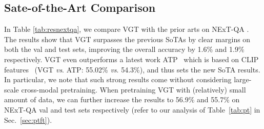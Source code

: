 \documentclass[runningheads]{llncs}
\newcommand{\vs}{\textit{vs}. }
\begin{document}
\subsection{Sate-of-the-Art Comparison}
In Table \ref{tab:resnextqa}, we compare VGT with the prior arts on NExT-QA \cite{xiao2021video}. The results show that VGT surpasses the previous SoTAs by clear margins on both the val and test sets, improving the overall accuracy by 1.6\% and 1.9\% respectively. VGT even outperforms a latest work ATP~\cite{buch2022revisiting} which is based on CLIP features~\cite{radford2021learning} (VGT \vs ATP: 55.02\% \vs 54.3\%), and thus sets the new SoTA results. In particular, we note that such strong results come without considering large-scale cross-modal pretraining. When pretraining VGT with (relatively) small amount of data, we can further increase the results to 56.9\% and 55.7\% on NExT-QA val and test sets respectively (refer to our analysis of Table~\ref{tab:pt} in Sec.~\ref{sec:ptft}). 
\setlength{\tabcolsep}{3.2pt}
\begin{table*}[t!]
    \small
    \centering
    \caption{Results on NExT-QA \cite{xiao2021next}. (Acc@C, T, D: Accuracy for Causal, Temporal and Descriptive questions respectively. *: Results reproduced with the official code.)
    }
    \vspace{-0.3cm}
    \label{tab:resnextqa}
    \vspace{-0.5cm}
\end{table*}
\end{document}
